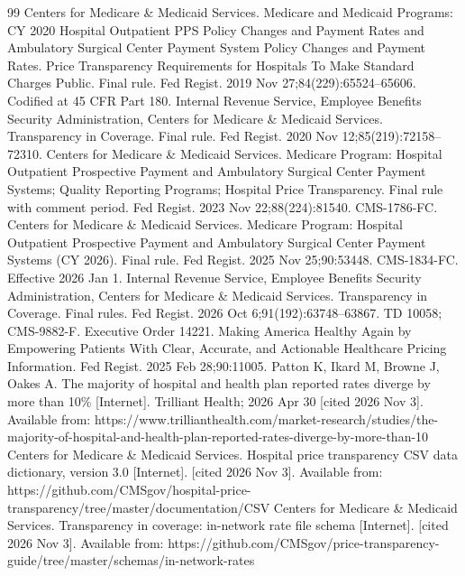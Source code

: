 \documentclass[10pt]{article}
\begin{document}
\begin{thebibliography}{99}
\footnotesize\setlength{\parskip}{0pt}\setlength{\itemsep}{1pt}
 Centers for Medicare \& Medicaid Services. Medicare and Medicaid Programs: CY 2020 Hospital Outpatient PPS Policy Changes and Payment Rates and Ambulatory Surgical Center Payment System Policy Changes and Payment Rates. Price Transparency Requirements for Hospitals To Make Standard Charges Public. Final rule. Fed Regist. 2019 Nov 27;84(229):65524--65606. Codified at 45 CFR Part 180.
 Internal Revenue Service, Employee Benefits Security Administration, Centers for Medicare \& Medicaid Services. Transparency in Coverage. Final rule. Fed Regist. 2020 Nov 12;85(219):72158--72310.
 Centers for Medicare \& Medicaid Services. Medicare Program: Hospital Outpatient Prospective Payment and Ambulatory Surgical Center Payment Systems; Quality Reporting Programs; Hospital Price Transparency. Final rule with comment period. Fed Regist. 2023 Nov 22;88(224):81540. CMS-1786-FC.
 Centers for Medicare \& Medicaid Services. Medicare Program: Hospital Outpatient Prospective Payment and Ambulatory Surgical Center Payment Systems (CY 2026). Final rule. Fed Regist. 2025 Nov 25;90:53448. CMS-1834-FC. Effective 2026 Jan 1.
 Internal Revenue Service, Employee Benefits Security Administration, Centers for Medicare \& Medicaid Services. Transparency in Coverage. Final rules. Fed Regist. 2026 Oct 6;91(192):63748--63867. TD 10058; CMS-9882-F.
 Executive Order 14221. Making America Healthy Again by Empowering Patients With Clear, Accurate, and Actionable Healthcare Pricing Information. Fed Regist. 2025 Feb 28;90:11005.
 Patton K, Ikard M, Browne J, Oakes A. The majority of hospital and health plan reported rates diverge by more than 10\% [Internet]. Trilliant Health; 2026 Apr 30 [cited 2026 Nov 3]. Available from: https://www.trillianthealth.com/market-research/studies/the-majority-of-hospital-and-health-plan-reported-rates-diverge-by-more-than-10
 Centers for Medicare \& Medicaid Services. Hospital price transparency CSV data dictionary, version 3.0 [Internet]. [cited 2026 Nov 3]. Available from: https://github.com/CMSgov/hospital-price-transparency/tree/master/documentation/CSV
 Centers for Medicare \& Medicaid Services. Transparency in coverage: in-network rate file schema [Internet]. [cited 2026 Nov 3]. Available from: https://github.com/CMSgov/price-transparency-guide/tree/master/schemas/in-network-rates

\end{thebibliography}
\end{document}
